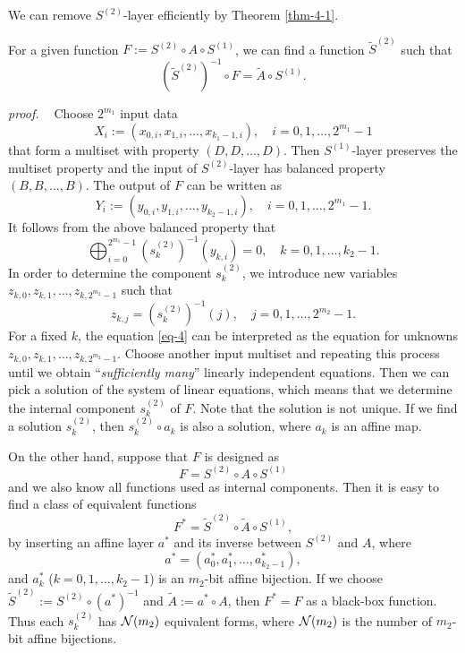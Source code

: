 \documentclass{ieeeaccess}
\begin{document}
We can remove $S^{(2)}$-layer efficiently by Theorem \ref{thm-4-1}.
\begin{theorem}\label{thm-4-1}
For a given function $F := S^{(2)}\circ A\circ S^{(1)}$,
we can find a function $\tilde{S}^{(2)}$ such that
\[
({\tilde{S}^{(2)}})^{-1} \circ F = \tilde A \circ S^{(1)}.
\]
\end{theorem}
{\it proof. \ } 
Choose $2^{m_1}$ input data %
\[
X_i := (x_{0,i}, x_{1,i}, \ldots, x_{k_1-1,i}), \quad i=0,1,\ldots, 2^{m_1}-1
\]
that form a multiset with property
$(D, D, \ldots, D)$.
Then $S^{(1)}$-layer preserves the multiset property and
the input of $S^{(2)}$-layer has balanced property $(B,B,\ldots, B)$.
The output of $F$ can be written as
\[
Y_i:=(y_{0,i}, y_{1,i}, \ldots, y_{k_2-1,i}), \quad i=0,1,\ldots, 2^{m_1}-1.
\]
It follows from the above balanced property that
\begin{equation}\label{eq-4}
\bigoplus_{i=0}^{2^{m_1}-1} (s_k^{(2)})^{-1}(y_{k,i}) = 0, \quad
k=0,1,\ldots, k_2-1.
\end{equation}
In order to determine the component $s_k^{(2)}$, we introduce new variables
$z_{k,0}, z_{k,1}, \ldots, z_{k,2^{m_2}-1}$ such that
\[
z_{k,j} = (s_k^{(2)})^{-1}(j), \quad j=0,1,\ldots, 2^{m_2}-1.
\]
For a fixed $k$, the equation \eqref{eq-4} can be interpreted as
the equation for unknowns $z_{k,0}, z_{k,1}, \ldots, z_{k,2^{m_2}-1}$.
Choose another input multiset and repeating this process 
until we obtain ``{\it sufficiently many}'' linearly independent equations.
Then we can pick a solution of the system of linear equations,
which means that we determine the internal component $s_k^{(2)}$ of $F$.
Note that the solution is not unique. If we find a solution $s_k^{(2)}$,
then  $s_k^{(2)}\circ a_k$ is also a solution, where $a_k$ is an affine map.


On the other hand, suppose that $F$ is designed as
\[
F= S^{(2)}\circ A\circ S^{(1)}
\]
and we also know all functions used as internal components.
Then it is easy to find a class of equivalent functions
\begin{equation}\label{eq-5}
F^* = \tilde S^{(2)} \circ \tilde A \circ S^{(1)},
\end{equation}
by inserting an affine layer $a^*$ and its inverse between $S^{(2)}$ and $A$,
where
\[
a^* = (a_0^*, a_1^*, \ldots, a_{k_2-1}^*),
\]
and $a_ k^*$ ($k=0,1,\ldots, k_2-1$) is an $m_2$-bit affine bijection.
If we choose $\tilde S^{(2)} := S^{(2)} \circ (a^*)^{-1}$ and $\tilde A := a^*\circ A$,
then $F^* = F$ as a black-box function.
Thus each $s_k^{(2)}$ has ${\cal N}(m_2)$ equivalent forms,
where ${\cal N}(m_2)$ is the number of $m_2$-bit affine bijections.
\end{document}
